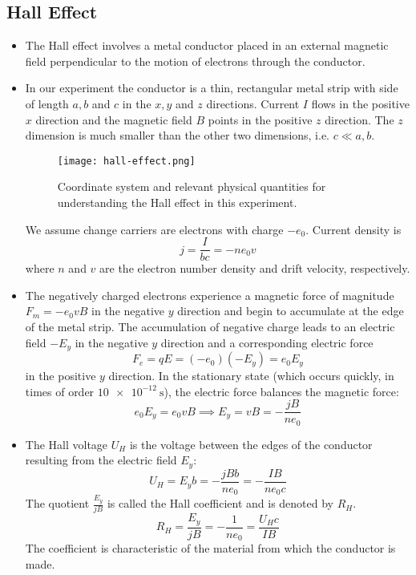 \documentclass[11pt, a4paper]{article}
\begin{document}
\subsection{Hall Effect}
\begin{itemize}
	\item The Hall effect involves a metal conductor placed in an external magnetic field perpendicular to the motion of electrons through the conductor.
	
	\item In our experiment the conductor is a thin, rectangular metal strip with side of length $ a, b $ and $ c $ in the $ x, y $ and $ z $ directions. Current $ I $ flows in the positive $ x $ direction and the magnetic field $ B $ points in the positive $ z $ direction. The $ z $ dimension is much smaller than the other two dimensions, i.e. $ c \ll a, b $. 
	
	
	\begin{figure}[htb!]
		\centering
		\texttt{[image: hall-effect.png]}
		\caption{Coordinate system and relevant physical quantities for understanding the Hall effect in this experiment.}
		\label{halpoj:fig:hall-effect}
	\end{figure}
	
	
	We assume change carriers are electrons with charge $ -e_{0} $. Current density is
	\begin{equation*}
		j = \frac{I}{bc} = - n e_{0} v
	\end{equation*}
	where $ n $ and $ v $ are the electron number density and drift velocity, respectively. 
	
	\item The negatively charged electrons experience a magnetic force of magnitude $ F_{m} = - e_{0} v B$  in the negative $ y $ direction and begin to accumulate at the edge of the metal strip. The accumulation of negative charge leads to an electric field $ -E_{y} $ in the negative $ y $ direction and a corresponding electric force
	\begin{equation*}
		F_{e} = qE = (-e_{0})(-E_{y}) = e_{0}E_{y}
	\end{equation*}
	in the positive $ y $ direction. In the stationary state (which occurs quickly, in times of order $ \SI{10e-12}{\second} $), the electric force balances the magnetic force:
	\begin{equation*}
		e_{0}E_{y} = e_{0}v B \implies E_{y} = vB = -\frac{jB}{ne_{0}}
	\end{equation*}
	
	\item The Hall voltage $ U_{H} $ is the voltage between the edges of the conductor resulting from the electric field $ E_{y} $:
	\begin{equation*}
		U_{H} = E_{y} b = - \frac{jBb}{ne_{0}} = -\frac{IB}{ne_{0}c}
	\end{equation*}
	The quotient $ \frac{E_{y}}{jB} $ is called the Hall coefficient and is denoted by $ R_{H} $.
	\begin{equation*}
		R_{H} =  \frac{E_{y}}{jB} = -\frac{1}{ne_{0}} = \frac{U_{H}c}{IB}
	\end{equation*}
	The coefficient is characteristic of the material from which the conductor is made.
	

\end{itemize}
\end{document}
